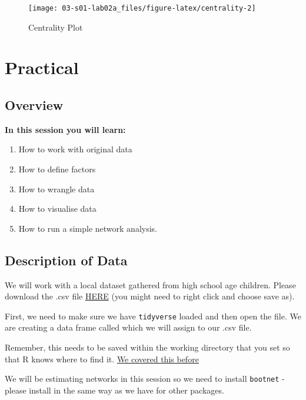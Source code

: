 \documentclass[]{book}
\providecommand{\tightlist}{%
  \setlength{\itemsep}{0pt}\setlength{\parskip}{0pt}}
\begin{document}
\begin{figure}

{\centering \texttt{[image: 03-s01-lab02a\_files/figure-latex/centrality-2]} 

}

\caption{Centrality Plot}\label{fig:centrality2}
\end{figure}

\hypertarget{practical}{%
\chapter{Practical}\label{practical}}

\hypertarget{overview-4}{%
\section{Overview}\label{overview-4}}

\textbf{In this session you will learn:}

\begin{enumerate}
\def\labelenumi{\arabic{enumi}.}
\tightlist
\item
  How to work with original data
\item
  How to define factors
\item
  How to wrangle data
\item
  How to visualise data
\item
  How to run a simple network analysis.
\end{enumerate}

\hypertarget{description-of-data}{%
\section{Description of Data}\label{description-of-data}}

We will work with a local dataset gathered from high school age children. Please download the .csv file \href{data/networkdataset.csv}{HERE} (you might need to right click and choose save as).

First, we need to make sure we have \texttt{tidyverse} loaded and then open the file. We are creating a data frame called which we will assign to our .csv file.

Remember, this needs to be saved within the working directory that you set so that R knows where to find it. \href{https://sallan2.github.io/networktraining/working-with-data-in-r.html}{We covered this before}

We will be estimating networks in this session so we need to install \texttt{bootnet} - please install in the same way as we have for other packages.
\end{document}
